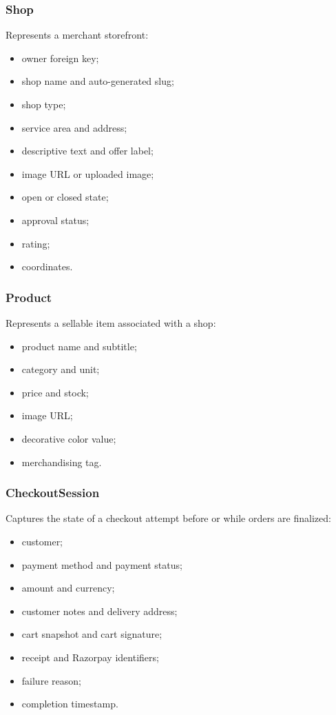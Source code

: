 \documentclass[12pt,a4paper]{article}
\begin{document}
\subsubsection{Shop}
Represents a merchant storefront:
\begin{itemize}[leftmargin=1.5em]
    \item owner foreign key;
    \item shop name and auto-generated slug;
    \item shop type;
    \item service area and address;
    \item descriptive text and offer label;
    \item image URL or uploaded image;
    \item open or closed state;
    \item approval status;
    \item rating;
    \item coordinates.
\end{itemize}

\subsubsection{Product}
Represents a sellable item associated with a shop:
\begin{itemize}[leftmargin=1.5em]
    \item product name and subtitle;
    \item category and unit;
    \item price and stock;
    \item image URL;
    \item decorative color value;
    \item merchandising tag.
\end{itemize}

\subsubsection{CheckoutSession}
Captures the state of a checkout attempt before or while orders are finalized:
\begin{itemize}[leftmargin=1.5em]
    \item customer;
    \item payment method and payment status;
    \item amount and currency;
    \item customer notes and delivery address;
    \item cart snapshot and cart signature;
    \item receipt and Razorpay identifiers;
    \item failure reason;
    \item completion timestamp.
\end{itemize}
\end{document}
